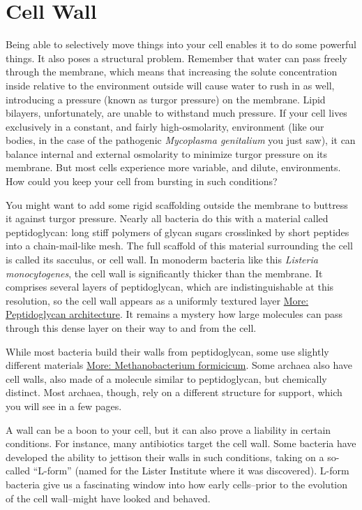 \documentclass[]{tufte-book}
\begin{document}
\hypertarget{cell-wall}{%
\section{Cell Wall}\label{cell-wall}}

Being able to selectively move things into your cell enables it to do some powerful things. It also poses a structural problem. Remember that water can pass freely through the membrane, which means that increasing the solute concentration inside relative to the environment outside will cause water to rush in as well, introducing a pressure (known as turgor pressure) on the membrane. Lipid bilayers, unfortunately, are unable to withstand much pressure. If your cell lives exclusively in a constant, and fairly high-osmolarity, environment (like our bodies, in the case of the pathogenic \emph{Mycoplasma genitalium} you just saw), it can balance internal and external osmolarity to minimize turgor pressure on its membrane. But most cells experience more variable, and dilute, environments. How could you keep your cell from bursting in such conditions?

You might want to add some rigid scaffolding outside the membrane to buttress it against turgor pressure. Nearly all bacteria do this with a material called peptidoglycan: long stiff polymers of glycan sugars crosslinked by short peptides into a chain-mail-like mesh. The full scaffold of this material surrounding the cell is called its sacculus, or cell wall. In monoderm bacteria like this \emph{Listeria monocytogenes}, the cell wall is significantly thicker than the membrane. It comprises several layers of peptidoglycan, which are indistinguishable at this resolution, so the cell wall appears as a uniformly textured layer \protect\hyperlink{Peptidoglycan_architecture}{More: Peptidoglycan architecture}. It remains a mystery how large molecules can pass through this dense layer on their way to and from the cell.

While most bacteria build their walls from peptidoglycan, some use slightly different materials \protect\hyperlink{Methanobacterium_formicicum}{More: Methanobacterium formicicum}. Some archaea also have cell walls, also made of a molecule similar to peptidoglycan, but chemically distinct. Most archaea, though, rely on a different structure for support, which you will see in a few pages.

A wall can be a boon to your cell, but it can also prove a liability in certain conditions. For instance, many antibiotics target the cell wall. Some bacteria have developed the ability to jettison their walls in such conditions, taking on a so-called ``L-form'' (named for the Lister Institute where it was discovered). L-form bacteria give us a fascinating window into how early cells--prior to the evolution of the cell wall--might have looked and behaved.
\end{document}
